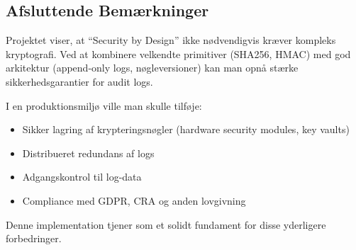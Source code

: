 \documentclass[12pt, a4paper, danish]{article}
\begin{document}
\subsection{Afsluttende Bemærkninger}

Projektet viser, at ``Security by Design'' ikke nødvendigvis kræver kompleks kryptografi. Ved at kombinere velkendte primitiver (SHA256, HMAC) med god arkitektur (append-only logs, nøgleversioner) kan man opnå stærke sikkerhedsgarantier for audit logs.

I en produktionsmiljø ville man skulle tilføje:
\begin{itemize}
    \item Sikker lagring af krypteringsnøgler (hardware security modules, key vaults)
    \item Distribueret redundans af logs
    \item Adgangskontrol til log-data
    \item Compliance med GDPR, CRA og anden lovgivning
\end{itemize}

Denne implementation tjener som et solidt fundament for disse yderligere forbedringer.
\end{document}
